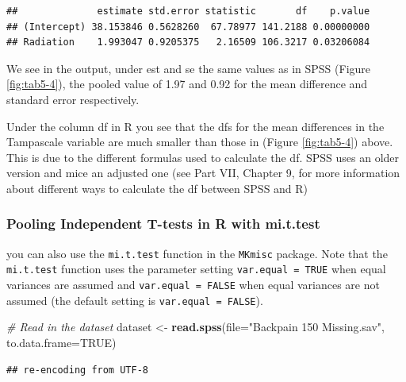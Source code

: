 \documentclass[]{book}
\newenvironment{Shaded}{\begin{snugshade}}{\end{snugshade}}
\newcommand{\KeywordTok}[1]{\textcolor[rgb]{0.13,0.29,0.53}{\textbf{#1}}}
\newcommand{\DataTypeTok}[1]{\textcolor[rgb]{0.13,0.29,0.53}{#1}}
\newcommand{\StringTok}[1]{\textcolor[rgb]{0.31,0.60,0.02}{#1}}
\newcommand{\CommentTok}[1]{\textcolor[rgb]{0.56,0.35,0.01}{\textit{#1}}}
\newcommand{\OtherTok}[1]{\textcolor[rgb]{0.56,0.35,0.01}{#1}}
\newcommand{\NormalTok}[1]{#1}
\begin{document}
\begin{verbatim}
##              estimate std.error statistic       df    p.value
## (Intercept) 38.153846 0.5628260  67.78977 141.2188 0.00000000
## Radiation    1.993047 0.9205375   2.16509 106.3217 0.03206084
\end{verbatim}

We see in the output, under est and se the same values as in SPSS
(Figure \ref{fig:tab5-4}), the pooled value of 1.97 and 0.92 for the
mean difference and standard error respectively.

Under the column df in R you see that the dfs for the mean differences
in the Tampascale variable are much smaller than those in (Figure
\ref{fig:tab5-4}) above. This is due to the different formulas used to
calculate the df. SPSS uses an older version and mice an adjusted one
(see Part VII, Chapter 9, for more information about different ways to
calculate the df between SPSS and R)

\subsubsection{Pooling Independent T-tests in R with
mi.t.test}\label{pooling-independent-t-tests-in-r-with-mi.t.test}

you can also use the \texttt{mi.t.test} function in the \texttt{MKmisc}
package. Note that the \texttt{mi.t.test} function uses the parameter
setting \texttt{var.equal\ =\ TRUE} when equal variances are assumed and
\texttt{var.equal\ =\ FALSE} when equal variances are not assumed (the
default setting is \texttt{var.equal\ =\ FALSE}).

\begin{Shaded}
\begin{Highlighting}[]
\CommentTok{# Read in the dataset}
\NormalTok{dataset <-}\StringTok{ }\KeywordTok{read.spss}\NormalTok{(}\DataTypeTok{file=}\StringTok{"Backpain 150 Missing.sav"}\NormalTok{, }\DataTypeTok{to.data.frame=}\OtherTok{TRUE}\NormalTok{)}
\end{Highlighting}
\end{Shaded}

\begin{verbatim}
## re-encoding from UTF-8
\end{verbatim}
\end{document}
